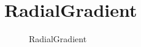 ﻿




\FloatBarrier
\section{
RadialGradient
}\label{c000015s000012}


\begin{figure}[htb] %
\marginnote{\setlength\fboxsep{2pt}\fbox{\footnotesize{\kaishu\figurename\,}\footnotesize{\ref{p000028}}}}\centering %
\setlength\fboxsep{0pt} %
\caption{RadialGradient} %
\label{p000028} %
\end{figure}


